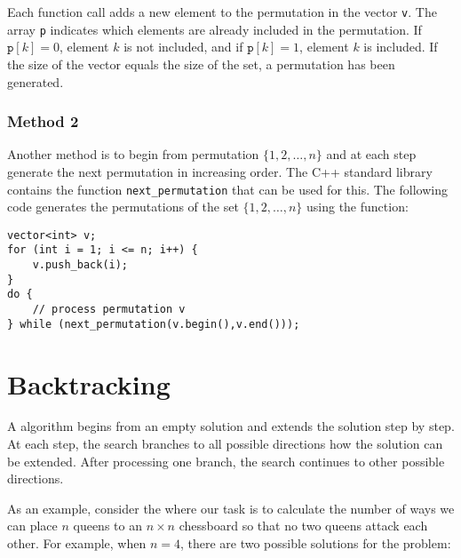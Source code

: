 Each function call adds a new element to
the permutation in the vector \texttt{v}.
The array \texttt{p} indicates which
elements are already included in the permutation.
If $\texttt{p}[k]=0$, element $k$ is not included,
and if $\texttt{p}[k]=1$, element $k$ is included.
If the size of the vector equals the size of the set,
a permutation has been generated.

\subsubsection{Method 2}


Another method is to begin from permutation
$\{1,2,\ldots,n\}$ and at each step generate the
next permutation in increasing order.
The C++ standard library contains the function
\texttt{next\_permutation} that can be used for this.
The following code generates the permutations
of the set $\{1,2,\ldots,n\}$ using the function:

\begin{lstlisting}
vector<int> v;
for (int i = 1; i <= n; i++) {
    v.push_back(i);
}
do {
    // process permutation v
} while (next_permutation(v.begin(),v.end()));
\end{lstlisting}

\section{Backtracking}


A  algorithm
begins from an empty solution
and extends the solution step by step.
At each step, the search branches
to all possible directions how the solution
can be extended.
After processing one branch, the search
continues to other possible directions.


As an example, consider the 
where our task is to calculate the number
of ways we can place $n$ queens to
an $n \times n$ chessboard so that
no two queens attack each other.
For example, when $n=4$,
there are two possible solutions for the problem:

\begin{center}
\end{center}

